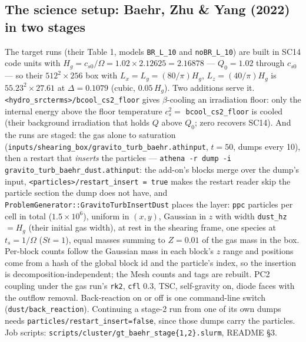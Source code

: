 \documentclass[11pt]{article}
\newcommand{\code}[1]{\texttt{#1}}
\newcommand{\file}[1]{\texttt{\small #1}}
\newcommand{\fn}[1]{\texttt{\small #1}}
\begin{document}
\subsection{The science setup: Baehr, Zhu \& Yang (2022) in two stages}
\label{sec:science}

The target runs (their Table 1, models \code{BR\_L\_10} and \code{noBR\_L\_10}) are
built in SC14 code units with $H_g = c_{s0}/\Omega = 1.02\times2.12625 = 2.16878$ ---
$Q_0 = 1.02$ through $c_{s0}$ --- so their $512^2\times256$ box with $L_x = L_y =
(80/\pi)H_g$, $L_z = (40/\pi)H_g$ is $55.23^2\times27.61$ at $\Delta = 0.1079$ (cubic,
$0.05\,H_g$). Two additions serve it. \code{<hydro\_srcterms>/bcool\_cs2\_floor} gives
$\beta$-cooling an irradiation floor: only the internal energy above the floor
temperature $c_s^2 = $ \code{bcool\_cs2\_floor} is cooled (their background
irradiation that holds $Q$ above $Q_0$; zero recovers SC14). And the runs are staged:
the gas alone to saturation (\file{inputs/shearing\_box/gravito\_turb\_baehr.athinput},
$t = 50$, dumps every 10), then a restart that \emph{inserts} the particles ---
\code{athena -r dump -i gravito\_turb\_baehr\_dust.athinput}: the add-on's blocks merge
over the dump's input, \code{<particles>/restart\_insert = true} makes the restart
reader skip the particle section the dump does not have, and
\fn{ProblemGenerator::GravitoTurbInsertDust} places the layer: \code{ppc} particles per
cell in total ($1.5\times10^6$), uniform in $(x,y)$, Gaussian in $z$ with width
\code{dust\_hz} $= H_g$ (their initial gas width), at rest in the shearing frame, one
species at $t_s = 1/\Omega$ ($St = 1$), equal masses summing to $Z = 0.01$ of the gas
mass in the box. Per-block counts follow the Gaussian mass in each block's $z$ range and
positions come from a hash of the global block id and the particle's index, so the
insertion is decomposition-independent; the Mesh counts and tags are rebuilt. PC2
coupling under the gas run's \code{rk2}, \code{cfl} $0.3$, TSC, self-gravity on, diode
faces with the outflow removal. Back-reaction on or off is one command-line switch
(\code{dust/back\_reaction}). Continuing a stage-2 run from one of its own dumps needs
\code{particles/restart\_insert=false}, since those dumps carry the particles. Job
scripts: \file{scripts/cluster/gt\_baehr\_stage\{1,2\}.slurm}, README \S3.
\end{document}
